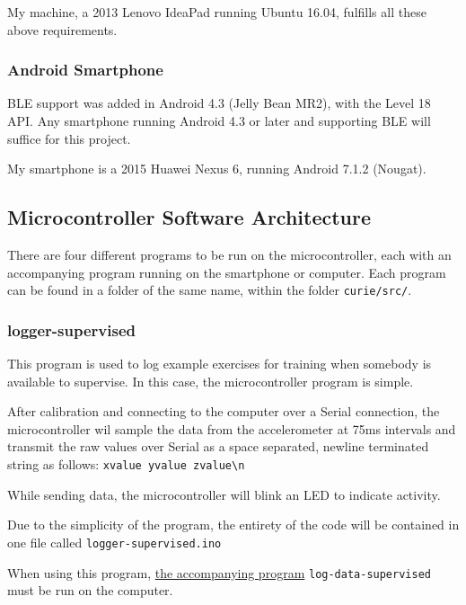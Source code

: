 \documentclass[a4paper]{article}
\begin{document}
My machine, a 2013 Lenovo IdeaPad running Ubuntu 16.04, fulfills all these above requirements.


\subsubsection{Android Smartphone}

BLE support was added in Android 4.3 (Jelly Bean MR2), with the Level 18 API.\cite{dsref6} Any smartphone running Android 4.3 or later and supporting BLE will suffice for this project.

My smartphone is a 2015 Huawei Nexus 6, running Android 7.1.2 (Nougat).


\subsection{Microcontroller Software Architecture}%
\label{subsec:dc_msa}

There are four different programs to be run on the microcontroller, each with an accompanying program running on the smartphone or computer. Each program can be found in a folder of the same name, within the folder \lstinline{curie/src/}.

\subsubsection{logger-supervised}%
\label{subsubsec:dc_msa_loggersupervised}

This program is used to log example exercises for training when somebody is available to supervise. In this case, the microcontroller program is simple.

After calibration and connecting to the computer over a Serial connection, the microcontroller wil sample the data from the accelerometer at 75ms intervals and transmit the raw values over Serial as a space separated, newline terminated string as follows:
\lstinline|xvalue yvalue zvalue\n|

While sending data, the microcontroller will blink an LED to indicate activity.

Due to the simplicity of the program, the entirety of the code will be contained in one file called \lstinline{logger-supervised.ino}

When using this program, \hyperref[subsubsec:dc_csa_logsupervised]{the accompanying program} \lstinline{log-data-supervised} must be run on the computer.
\end{document}
